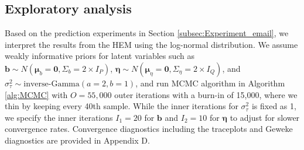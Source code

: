 \documentclass[ba]{imsart}
\numberwithin{equation}{section}
\theoremstyle{plain}
\begin{document}
	\subsection{Exploratory analysis}\label{subsec:Result_email}
	Based on the prediction experiments in Section \ref{subsec:Experiment_email}, we interpret the results from the HEM using the log-normal distribution. We assume weakly informative priors for latent variables such as $\boldsymbol{b}\sim N(\boldsymbol{\mu}_b=\boldsymbol{0}, \Sigma_b = 2\times I_P)$, $\boldsymbol{\eta}\sim N(\boldsymbol{\mu}_\eta=\boldsymbol{0}, \Sigma_\eta = 2\times I_Q)$, and $\sigma_\tau^2 \sim \mbox{inverse-Gamma}(a=2, b=1)$, and run MCMC algorithm in Algorithm \ref{alg:MCMC} with $O=55,000$ outer iterations with a burn-in of 15,000, where we thin by keeping every 40th sample. While the inner iterations for $\sigma_\tau^2$ is fixed as 1, we specify the inner iterations $I_1=20$ for $\boldsymbol{b}$ and $I_2=10$ for $\boldsymbol{\eta}$ to adjust for slower convergence rates. Convergence diagnostics including the traceplots and Geweke diagnostics \citep{geweke1991evaluating} are provided in Appendix D.
	
\end{document}
